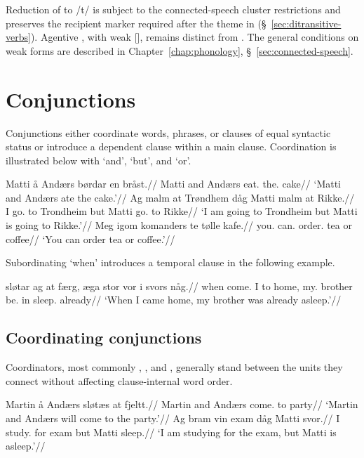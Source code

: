 Reduction of  to /t/ is subject to the connected-speech cluster restrictions and preserves the recipient marker required after the theme in  (\S~\ref{sec:ditransitive-verbs}). Agentive , with weak [], remains distinct from . The general conditions on weak forms are described in Chapter~\ref{chap:phonology}, \S~\ref{sec:connected-speech}.

\section{Conjunctions}

Conjunctions either coordinate words, phrases, or clauses of equal syntactic status or introduce a dependent clause within a main clause. Coordination is illustrated below with  `and',  `but', and  `or'.

\pex
\a
\begingl
\gla Matti å Andærs børdar en bråst.//
\glb Matti and Andærs eat.\Pst{} the.\M{} cake//
\glft `Matti and Andærs ate the cake.'//
\endgl
\a
\begingl
\gla Ag malm at Trøndhem dåg Matti malm at Rikke.//
\glb I go.\Pres{} to Trondheim but Matti go.\Pres{} to Rikke//
\glft `I am going to Trondheim but Matti is going to Rikke.'//
\endgl
\a
\begingl
\gla Meg igom komanders te tølle kafe.//
\glb you.\Sg{} can.\Pres{} order.\Inf{} tea or coffee//
\glft `You can order tea or coffee.'//
\endgl
\xe

Subordinating  `when' introduces a temporal clause in the following example.

\pex
\a
\begingl
{} sløtar ag at færg, \ae{}ga stor vor i svors någ.//
\glb when come.\Pst{} I to home, my.\M{} brother be.\Pst{} in sleep.\Inf{} already//
\glft `When I came home, my brother was already asleep.'//
\endgl
\a
\xe


\subsection{Coordinating conjunctions}

Coordinators, most commonly , , and , generally stand between the units they connect without affecting clause-internal word order.

\pex
\a
\begingl
\gla Martin å Andærs sløtæs at fjeltt.//
\glb Martin and Andærs come.\Fut{} to party//
\glft `Martin and Andærs will come to the party.'//
\endgl
\a
\begingl
\gla Ag bram vin exam dåg Matti svor.//
\glb I study.\Pres{} for exam but Matti sleep.\Pres{}//
\glft `I am studying for the exam, but Matti is asleep.'//
\endgl
\xe

